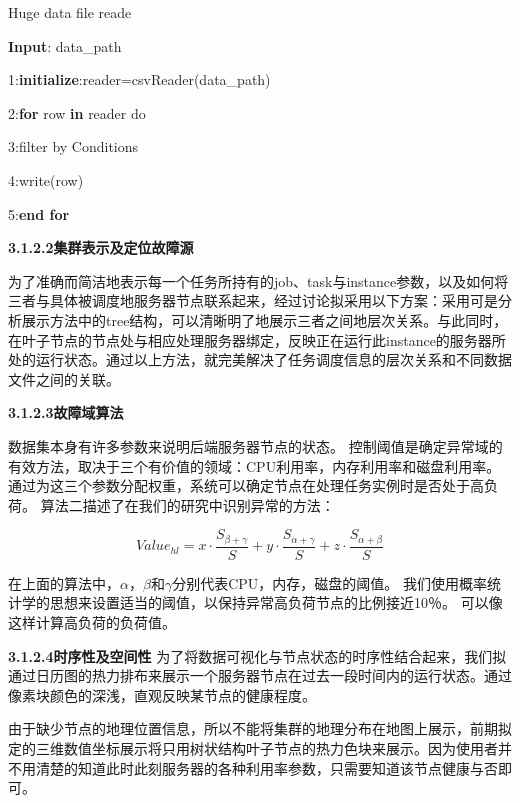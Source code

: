 \begin{algorithm}
	\caption{Huge data file reade}
	\label{alg-1} 
	\textbf{Input}: data\_path
	
	1:\textbf{initialize}:reader=csvReader(data\_path)
	
	2:\textbf{for} row  \textbf{in} reader do
	
	3:\qquad filter by Conditions
	
	4:\qquad write(row)
	
	5:\textbf{end for}

\end{algorithm}

{\textbf{3.1.2.2\quad 集群表示及定位故障源}}

为了准确而简洁地表示每一个任务所持有的job、task与instance参数，以及如何将三者与具体被调度地服务器节点联系起来，经过讨论拟采用以下方案：采用可是分析展示方法中的tree结构，可以清晰明了地展示三者之间地层次关系。与此同时，在叶子节点的节点处与相应处理服务器绑定，反映正在运行此instance的服务器所处的运行状态。通过以上方法，就完美解决了任务调度信息的层次关系和不同数据文件之间的关联。

{\textbf{3.1.2.3\quad 故障域算法}}

数据集本身有许多参数来说明后端服务器节点的状态。 控制阈值是确定异常域的有效方法，取决于三个有价值的领域：CPU利用率，内存利用率和磁盘利用率。 通过为这三个参数分配权重，系统可以确定节点在处理任务实例时是否处于高负荷。 算法二描述了在我们的研究中识别异常的方法：

$$Value_{hl}=x\cdot\frac{S_{\beta +\gamma}}{S}+y\cdot\frac{S_{\alpha+\gamma}}{S}+z\cdot\frac{S_{\alpha+\beta}}{S}$$

在上面的算法中，$\alpha$，$\beta$和$\gamma$分别代表CPU，内存，磁盘的阈值。 我们使用概率统计学的思想来设置适当的阈值，以保持异常高负荷节点的比例接近10％。 可以像这样计算高负荷的负荷值。

{\textbf{3.1.2.4\quad 时序性及空间性}}
为了将数据可视化与节点状态的时序性结合起来，我们拟通过日历图的热力排布来展示一个服务器节点在过去一段时间内的运行状态。通过像素块颜色的深浅，直观反映某节点的健康程度。

由于缺少节点的地理位置信息，所以不能将集群的地理分布在地图上展示，前期拟定的三维数值坐标展示将只用树状结构叶子节点的热力色块来展示。因为使用者并不用清楚的知道此时此刻服务器的各种利用率参数，只需要知道该节点健康与否即可。